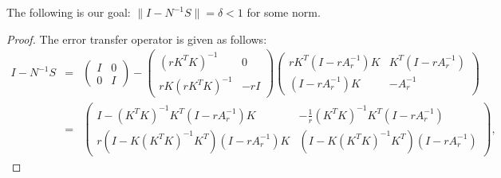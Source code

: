 \begin{itemize}
\begin{lemma}
The following is our goal: 
$\|I - N^{-1}S\| = \delta < 1$
for some norm. 
\end{lemma}
\begin{proof}
The error transfer operator is given as follows: 
\begin{eqnarray*}
I - N^{-1}S &=& 
\left ( \begin{matrix}
I & 0 \\ 
0 & I 
\end{matrix} \right ) - \begin{pmatrix}
     (r K^T K)^{-1} &  0 \\
    r K (r K^T K)^{-1} & -r I
    \end{pmatrix} \begin{pmatrix}
    r K^T \left(I - r A_{r}^{-1} \right)K  & K^T (I -  r A_{r}^{-1} ) \\
    (I -  r A_{r}^{-1} ) K  & - A_{r}^{-1}
    \end{pmatrix}   \\
&=& \begin{pmatrix}
I - (K^TK)^{-1} K^T (I - r A_r^{-1}) K&  -\frac{1}{r} (K^TK)^{-1} K^T (I - r A_r^{-1}) \\
r(I - K (K^TK)^{-1} K^T) (I - r A_r^{-1}) K  & (I - K (K^TK)^{-1} K^T) (I - r A_r^{-1})
\end{pmatrix},
\end{eqnarray*}
%


\end{proof}


\end{itemize}
